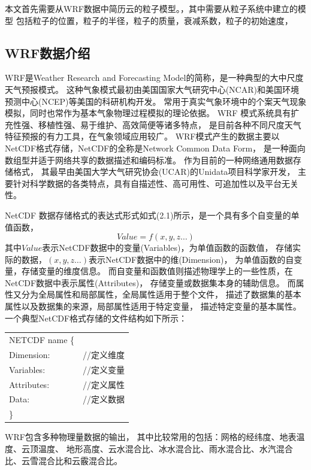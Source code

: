 本文首先需要从WRF数据中简历云的粒子模型。，其中需要从粒子系统中建立的模型
包括粒子的位置，粒子的半径，粒子的质量，衰减系数，粒子的初始速度，

\subsection{WRF数据介绍}
WRF是Weather Research and Forecasting Model的简称，是一种典型的大中尺度天气预报模式。
这种气象模式最初由美国国家大气研究中心(NCAR)和美国环境预测中心(NCEP)等美国的科研机构开发。
常用于真实气象环境中的个案天气现象模拟，同时也常作为基本气象物理过程模拟的理论依据。
WRF 模式系统具有扩充性强、移植性强、易于维护、高效简便等诸多特点，
是目前各种不同尺度天气特征预报的有力工具，在气象领域应用较广。
WRF模式产生的数据主要以NetCDF格式存储，NetCDF的全称是Network Common Data Form，
是一种面向数组型并适于网络共享的数据描述和编码标准。
作为目前的一种网络通用数据存储格式，
其最早由美国大学大气研究协会(UCAR)的Unidata项目科学家开发，
主要针对科学数据的各类特点，具有自描述性、高可用性、可追加性以及平台无关性。

NetCDF 数据存储格式的表达式形式如式(2.1)所示，是一个具有多个自变量的单值函数，
\begin{equation}
\label{equ:netcdf-function}
Value = f(x,y,z\dots)
\end{equation}
其中$Value$表示NetCDF数据中的变量(Variables)，为单值函数的函数值，
存储实际的数据，$(x,y,z\dots)$表示NetCDF数据中的维(Dimension)，
为单值函数的自变量，存储变量的维度信息。
而自变量和函数值则描述物理学上的一些性质，在NetCDF数据中表示属性(Attributes)，
存储变量或数据集本身的辅助信息。
而属性又分为全局属性和局部属性，全局属性适用于整个文件，
描述了数据集的基本属性以及数据集的来源，局部属性适用于特定变量，
描述特定变量的基本属性。一个典型NetCDF格式存储的文件结构如下所示：

\begin{tabular}{ll}
NETCDF name \{ & \\
\qquad{}Dimension:  &  //定义维度 \\
\qquad{}Variables:  & //定义变量 \\
\qquad{}Attributes: & //定义属性 \\
\qquad{}Data:       & //定义数据 \\
\}  & \\
\end{tabular}

WRF包含多种物理量数据的输出，
其中比较常用的包括：网格的经纬度、地表温度、云顶温度、
地形高度、云水混合比、冰水混合比、雨水混合比、水汽混合比、云雪混合比和云霰混合比。


